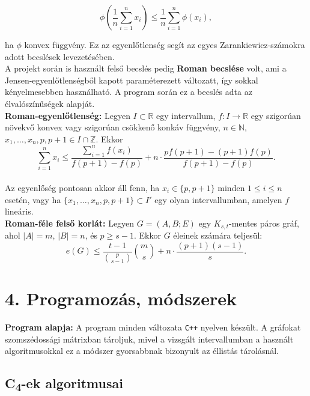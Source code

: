 \documentclass[12pt,a4paper]{article}
\begin{document}
\[
\phi\left( \frac{1}{n} \sum_{i=1}^{n} x_i \right) \leq \frac{1}{n} \sum_{i=1}^{n} \phi(x_i),
\]

ha $\phi$ konvex függvény. Ez az egyenlőtlenség segít az egyes Zarankiewicz-számokra adott becslések levezetésében.
\\[2mm]
A projekt során is használt felső becslés pedig \textbf{Roman becslése} volt, ami a Jensen-egyenlőtlenségből kapott paraméterezett változatt, így sokkal kényelmesebben használható. A program során ez a becslés adta az élvalószínűségek alapját.
\\[2mm]
\textbf{Roman-egyenlőtlenség:} Legyen $I \subset \mathbb{R}$ egy intervallum, $f : I \to \mathbb{R}$ egy szigorúan növekvő konvex vagy szigorúan csökkenő konkáv függvény, $n \in \mathbb{N}$, $x_1, \dots, x_n, p, p+1 \in I \cap \mathbb{Z}$. Ekkor
\[
\sum_{i=1}^{n} x_i \leq \frac{\sum_{i=1}^{n} f(x_i)}{f(p+1) - f(p)} + n \cdot \frac{p f(p+1) - (p+1) f(p)}{f(p+1) - f(p)}.
\]
\\[2mm]
Az egyenlőség pontosan akkor áll fenn, ha $x_i \in \{p, p+1\}$ minden $1 \leq i \leq n$ esetén, vagy ha $\{x_1, \dots, x_n, p, p+1\} \subset I'$ egy olyan intervallumban, amelyen $f$ lineáris.
\\[2mm]
\textbf{Roman-féle felső korlát:} Legyen $G = (A, B; E)$ egy $K_{s,t}$-mentes páros gráf, ahol $|A| = m$, $|B| = n$, és $p \geq s - 1$. Ekkor $G$ éleinek számára teljesül:
\[
e(G) \leq \frac{t - 1}{\binom{p}{s - 1}} \binom{m}{s} + n \cdot \frac{(p + 1)(s - 1)}{s}.
\]

\section*{4. Programozás, módszerek}

\textbf{Program alapja:} A program minden változata \texttt{C++} nyelven készült. A gráfokat szomszédossági mátrixban tároljuk, mivel a vizsgált intervallumban a használt algoritmusokkal ez a módszer gyorsabbnak bizonyult az éllistás tárolásnál.


\subsection*{C\textsubscript{4}-ek algoritmusai}
\end{document}
